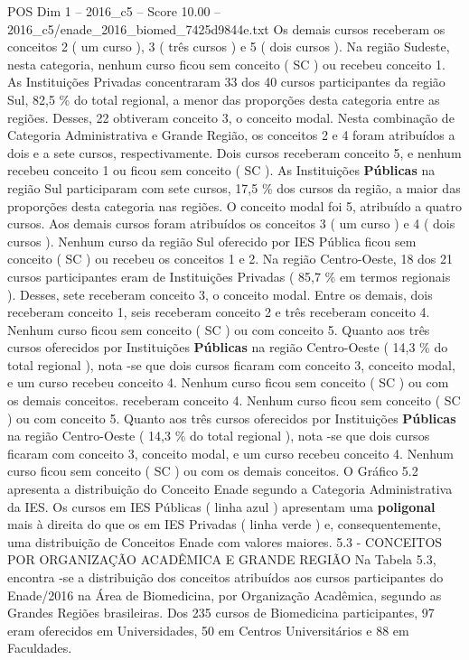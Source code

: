 \begin{textsample}{POS Dim 1 – 2016\_c5 – Score 10.00 – 2016\_c5/enade\_2016\_biomed\_7425d9844e.txt}
Os demais cursos receberam os conceitos 2 ( um curso ), 3 ( três cursos ) e 5 ( dois cursos ).
Na região Sudeste, nesta categoria, nenhum curso ficou sem conceito ( SC ) ou recebeu conceito 1.
As Instituições Privadas concentraram 33 dos 40 cursos participantes da região Sul, 82,5 \% do total regional, a menor das proporções desta categoria entre as regiões.
Desses, 22 obtiveram conceito 3, o conceito modal.
Nesta combinação de Categoria Administrativa e Grande Região, os conceitos 2 e 4 foram atribuídos a dois e a sete cursos, respectivamente.
Dois cursos receberam conceito 5, e nenhum recebeu conceito 1 ou ficou sem conceito ( SC ).
As Instituições \textbf{Públicas} na região Sul participaram com sete cursos, 17,5 \% dos cursos da região, a maior das proporções desta categoria nas regiões.
O conceito modal foi 5, atribuído a quatro cursos.
Aos demais cursos foram atribuídos os conceitos 3 ( um curso ) e 4 ( dois cursos ).
Nenhum curso da região Sul oferecido por IES Pública ficou sem conceito ( SC ) ou recebeu os conceitos 1 e 2.
Na região Centro-Oeste, 18 dos 21 cursos participantes eram de Instituições Privadas ( 85,7 \% em termos regionais ).
Desses, sete receberam conceito 3, o conceito modal.
Entre os demais, dois receberam conceito 1, seis receberam conceito 2 e três receberam conceito 4.
Nenhum curso ficou sem conceito ( SC ) ou com conceito 5.
Quanto aos três cursos oferecidos por Instituições \textbf{Públicas} na região Centro-Oeste ( 14,3 \% do total regional ), nota -se que dois cursos ficaram com conceito 3, conceito modal, e um curso recebeu conceito 4.
Nenhum curso ficou sem conceito ( SC ) ou com os demais conceitos. receberam conceito 4.
Nenhum curso ficou sem conceito ( SC ) ou com conceito 5.
Quanto aos três cursos oferecidos por Instituições \textbf{Públicas} na região Centro-Oeste ( 14,3 \% do total regional ), nota -se que dois cursos ficaram com conceito 3, conceito modal, e um curso recebeu conceito 4.
Nenhum curso ficou sem conceito ( SC ) ou com os demais conceitos.
O Gráfico 5.2 apresenta a distribuição do Conceito Enade segundo a Categoria Administrativa da IES.
Os cursos em IES Públicas ( linha azul ) apresentam uma \textbf{poligonal} mais à direita do que os em IES Privadas ( linha verde ) e, consequentemente, uma distribuição de Conceitos Enade com valores maiores. 5.3 - CONCEITOS POR ORGANIZAÇÃO ACADÊMICA E GRANDE REGIÃO Na Tabela 5.3, encontra -se a distribuição dos conceitos atribuídos aos cursos participantes do Enade/2016 na Área de Biomedicina, por Organização Acadêmica, segundo as Grandes Regiões brasileiras.
Dos 235 cursos de Biomedicina participantes, 97 eram oferecidos em Universidades, 50 em Centros Universitários e 88 em Faculdades.

\end{textsample}
